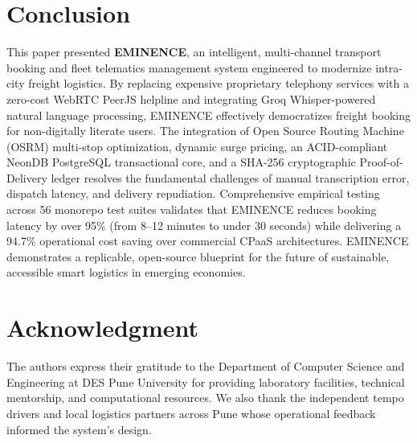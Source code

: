 \documentclass[conference]{IEEEtran}
\begin{document}
\section{Conclusion}
This paper presented \textbf{EMINENCE}, an intelligent, multi-channel transport booking and fleet telematics management system engineered to modernize intra-city freight logistics. By replacing expensive proprietary telephony services with a zero-cost WebRTC PeerJS helpline and integrating Groq Whisper-powered natural language processing, EMINENCE effectively democratizes freight booking for non-digitally literate users. The integration of Open Source Routing Machine (OSRM) multi-stop optimization, dynamic surge pricing, an ACID-compliant NeonDB PostgreSQL transactional core, and a SHA-256 cryptographic Proof-of-Delivery ledger resolves the fundamental challenges of manual transcription error, dispatch latency, and delivery repudiation. Comprehensive empirical testing across 56 monorepo test suites validates that EMINENCE reduces booking latency by over 95\% (from 8--12 minutes to under 30 seconds) while delivering a 94.7\% operational cost saving over commercial CPaaS architectures. EMINENCE demonstrates a replicable, open-source blueprint for the future of sustainable, accessible smart logistics in emerging economies.

\section*{Acknowledgment}
The authors express their gratitude to the Department of Computer Science and Engineering at DES Pune University for providing laboratory facilities, technical mentorship, and computational resources. We also thank the independent tempo drivers and local logistics partners across Pune whose operational feedback informed the system's design.
\end{document}
